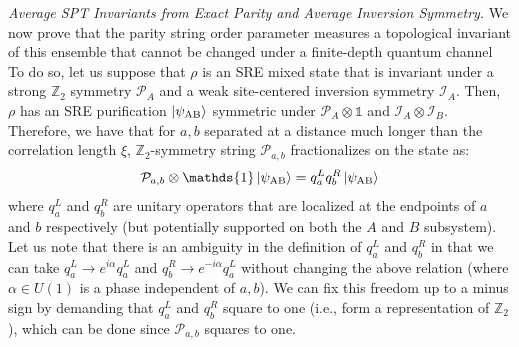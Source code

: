 \documentclass[preprint,superscriptaddress,floatfix, nofootinbib]{revtex4-2}
\begin{document}
\textit{Average SPT Invariants from Exact Parity and Average Inversion Symmetry.} We now prove that the parity string order parameter measures a topological invariant of this ensemble that cannot be changed under a finite-depth quantum channel
%
To do so, let us suppose that $\rho$ is an SRE mixed state that is invariant under a strong $\mathbb{Z}_2$ symmetry $\mathcal{P}_A$ and a weak site-centered inversion symmetry $\mathcal{I}_A$.
%
Then, $\rho$ has an SRE purification $\ket{\psi_{\text{AB}}}$ symmetric under $\mathcal{P}_A \otimes \mathds{1}$ and $\mathcal{I}_A \otimes \mathcal{I}_B$.
%
Therefore, we have that for $a, b$ separated at a distance much longer than the correlation length $\xi$, $\mathbb{Z}_2$-symmetry string $\mathcal{P}_{a, b}$ fractionalizes on the state as:
\begin{equation}
    \mathcal{P}_{a, b} \otimes \mathds{1} \ket{\psi_{\text{AB}}} = q^L_a q^R_b \ket{\psi_{\text{AB}}}
\end{equation}
where $q^L_a$ and $q^R_b$ are unitary operators that are localized at the endpoints of $a$ and $b$ respectively (but potentially supported on both the $A$ and $B$ subsystem).
%
Let us note that there is an ambiguity in the definition of $q^L_a$ and $q^R_b$ in that we can take $q_{a}^L \to e^{i \alpha} q_a^{L}$ and $q_{b}^{R} \to e^{-i \alpha} q_a^{L}$ without changing the above relation (where $\alpha \in U(1)$ is a phase independent of $a, b$).
%
We can fix this freedom up to a minus sign by demanding that $q_a^L$ and $q_b^R$ square to one (i.e., form a representation of $\mathbb{Z}_2$), which can be done since $\mathcal{P}_{a, b}$ squares to one.
\end{document}
